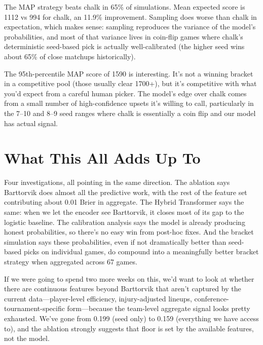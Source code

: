 \documentclass[11pt,a4paper]{article}
\begin{document}
The MAP strategy beats chalk in 65\% of simulations. Mean expected score is 1112 vs 994 for chalk, an 11.9\% improvement. Sampling does worse than chalk in expectation, which makes sense: sampling reproduces the variance of the model's probabilities, and most of that variance lives in coin-flip games where chalk's deterministic seed-based pick is actually well-calibrated (the higher seed wins about 65\% of close matchups historically).

The 95th-percentile MAP score of 1590 is interesting. It's not a winning bracket in a competitive pool (those usually clear 1700+), but it's competitive with what you'd expect from a careful human picker. The model's edge over chalk comes from a small number of high-confidence upsets it's willing to call, particularly in the 7--10 and 8--9 seed ranges where chalk is essentially a coin flip and our model has actual signal.


\section{What This All Adds Up To}

Four investigations, all pointing in the same direction. The ablation says Barttorvik does almost all the predictive work, with the rest of the feature set contributing about 0.01 Brier in aggregate. The Hybrid Transformer says the same: when we let the encoder see Barttorvik, it closes most of its gap to the logistic baseline. The calibration analysis says the model is already producing honest probabilities, so there's no easy win from post-hoc fixes. And the bracket simulation says these probabilities, even if not dramatically better than seed-based picks on individual games, do compound into a meaningfully better bracket strategy when aggregated across 67 games.

If we were going to spend two more weeks on this, we'd want to look at whether there are continuous features beyond Barttorvik that aren't captured by the current data---player-level efficiency, injury-adjusted lineups, conference-tournament-specific form---because the team-level aggregate signal looks pretty exhausted. We've gone from 0.199 (seed only) to 0.159 (everything we have access to), and the ablation strongly suggests that floor is set by the available features, not the model.


\end{document}
